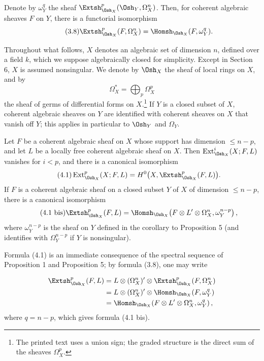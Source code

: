  Denote by $\omega_Y^{q}$ the sheaf
$\Extsh_{\Osh_X}^{p}(\Osh_Y,\Omega_X^{n})$. Then, for coherent algebraic sheaves
$F$ on $Y$, there is a functorial isomorphism
\begin{equation}\tag{3.8}
  \Extsh_{\Osh_X}^{p}(F,\Omega_X^{n})
  =\Homsh_{\Osh_X}(F,\omega_Y^{q}).
\end{equation}


Throughout what follows, $X$ denotes an algebraic set of dimension $n$, defined
over a field $k$, which we suppose algebraically closed for simplicity. Except
in Section 6, $X$ is assumed nonsingular. We denote by $\Osh_X$ the sheaf of
local rings on $X$, and by
\[
  \Omega_X^{*}=\bigoplus_p\Omega_X^{p}
\]
the sheaf of germs of differential forms on $X$.\footnote{The printed text uses
a union sign; the graded structure is the direct sum of the sheaves
$\Omega_X^p$.} If $Y$ is a closed subset of $X$, coherent algebraic sheaves on
$Y$ are identified with coherent sheaves on $X$ that vanish off $Y$; this
applies in particular to $\Osh_Y$ and $\Omega_Y$.

 Let $F$ be a coherent algebraic sheaf on $X$ whose support
has dimension $\leq n-p$, and let $L$ be a locally free coherent algebraic sheaf
on $X$. Then $\operatorname{Ext}_{\Osh_X}^{i}(X;F,L)$ vanishes for $i<p$, and
there is a canonical isomorphism
\begin{equation}\tag{4.1}
  \operatorname{Ext}_{\Osh_X}^{p}(X;F,L)
  =H^{0}\bigl(X,\Extsh_{\Osh_X}^{p}(F,L)\bigr).
\end{equation}
If $F$ is a coherent algebraic sheaf on a closed subset $Y$ of $X$ of dimension
$\leq n-p$, there is a canonical isomorphism
\begin{equation}\tag{4.1 bis}
  \Extsh_{\Osh_X}^{p}(F,L)
  =\Homsh_{\Osh_X}\!\left(
    F\otimes L'\otimes\Omega_X^{n},\omega_Y^{n-p}
  \right),
\end{equation}
where $\omega_Y^{n-p}$ is the sheaf on $Y$ defined in the corollary to
Proposition 5 (and identifies with $\Omega_Y^{n-p}$ if $Y$ is nonsingular).

Formula (4.1) is an immediate consequence of the spectral sequence of
Proposition 1 and Proposition 5; by formula (3.8), one may write

\begin{align*}
\Extsh_{\Osh_X}^{p}(F,L)
&=L\otimes(\Omega_X^{n})'\otimes
  \Extsh_{\Osh_X}^{p}(F,\Omega_X^{n})\\
&=L\otimes(\Omega_X^{n})'\otimes
  \Homsh_{\Osh_X}(F,\omega_Y^{q})\\
&=\Homsh_{\Osh_X}\!\left(
  F\otimes L'\otimes\Omega_X^{n},\omega_Y^{q}\right),
\end{align*}
where $q=n-p$, which gives formula (4.1 bis).


